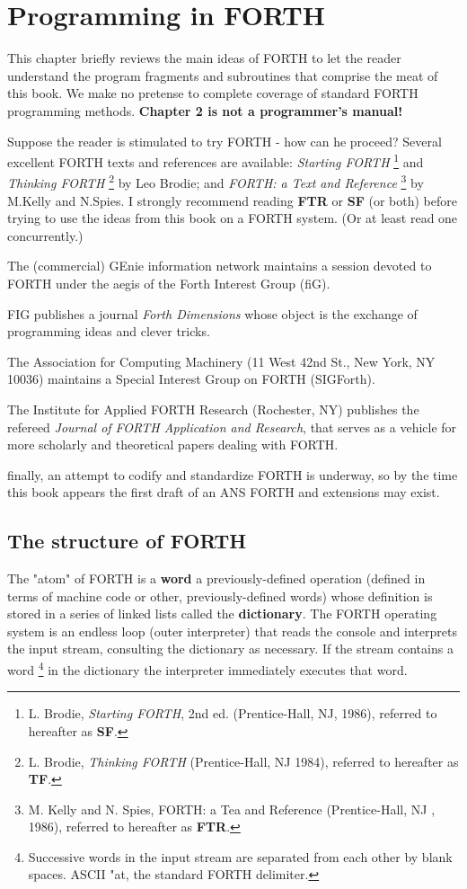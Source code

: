 ﻿\chapter{Programming in FORTH}

This chapter briefly reviews the main ideas of FORTH to let the reader understand the program fragments and subroutines that comprise the meat of this book. We make no pretense to complete coverage of standard FORTH programming methods. \textbf{Chapter 2 is not a programmer’s manual!}

Suppose the reader is stimulated to try FORTH - how can he proceed? Several excellent FORTH texts and references are available: \textit{Starting FORTH} \footnote{L. Brodie, \textit{Starting FORTH}, 2nd ed. (Prentice-Hall, NJ, 1986), referred to hereafter as \textbf{SF}.} and \textit{Thinking FORTH} \footnote{L. Brodie, \textit{Thinking FORTH} (Prentice-Hall, NJ 1984), referred to hereafter as \textbf{TF}.} by Leo Brodie; and \textit{ FORTH: a Text and Reference} \footnote{M. Kelly and N. Spies, FORTH: a Tea and Reference (Prentice-Hall, NJ , 1986), referred to hereafter as \textbf{FTR}.} by M.Kelly and N.Spies. I strongly recommend reading \textbf{FTR} or \textbf{SF} (or both) before trying to use the ideas from this book on a FORTH system. (Or at least read one concurrently.)

The (commercial) GEnie information network maintains a session devoted to FORTH under the aegis of the Forth Interest Group (fiG).

FIG publishes a journal \textit{Forth Dimensions} whose object is the exchange of programming ideas and clever tricks.

The Association for Computing Machinery (11 West 42nd St., New York, NY 10036) maintains a Special Interest Group on FORTH (SIGForth).

The Institute for Applied FORTH Research (Rochester, NY) publishes the refereed \textit{Journal of FORTH Application and Research}, that serves as a vehicle for more scholarly and theoretical papers dealing with FORTH.

finally, an attempt to codify and standardize FORTH is underway, so by the time this book appears the first draft of an ANS FORTH and extensions may exist.

\section{The structure of FORTH}

The "atom" of FORTH is a \textbf{word} a previously-defined operation (defined in terms of machine code or other, previously-defined words) whose definition is stored in a series of linked lists called the \textbf{dictionary}. The FORTH operating system is an endless loop (outer interpreter) that reads the console and interprets the input stream, consulting the dictionary as necessary. If the stream contains a word \footnote{Successive words in the input stream are separated from each other by blank spaces. ASCII "at, the standard FORTH delimiter.} in the dictionary the interpreter immediately executes that word.

